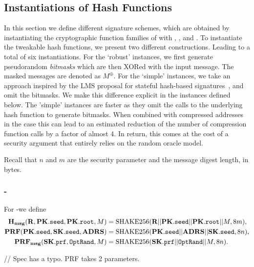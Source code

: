 

\subsection{Instantiations of Hash Functions}
\label{subsec:instanthash}
In this section we define different signature schemes, which are obtained 
by instantiating the cryptographic function families of \spx with \shatwo, 
\shathree, and \haraka. To instantiate the tweakable hash functions,
we present two different constructions. Leading to a total of six instantiations.
For the `robust' instances,
we first generate pseudorandom \emph{bitmasks}
which are then XORed with the input message. The masked messages are denoted
as $M^{\oplus}$.
For the `simple' instances, we take an approach inspired by the LMS proposal for stateful hash-based signatures~\cite{LMSdraft}, and omit the bitmasks.
We make this difference explicit in the instances defined below. The 'simple' instances 
are faster as they omit the calls to the underlying hash function to generate bitmasks. When combined with compressed addresses in the \shatwo case this can lead to an estimated reduction of the number of 
compression function calls by a factor of almost 4. In return, this comes at the cost of a 
security argument that entirely relies on the random oracle model. 

Recall that $n$ and $m$ are the security parameter and the message digest length, in bytes.

\subsubsection{\spx-\shathree}
   For \spx-\shathree we define
   \begin{equation}
      \begin{aligned}
         \mathbf{H_{msg}}(\mathbf{R},\mathbf{PK}.\texttt{seed}, \mathbf{PK}.\texttt{root}, M) &= \text{SHAKE256}(\mathbf{R} || \mathbf{PK}.\texttt{seed} || \mathbf{PK}.\texttt{root} || M, 8m),\\
         \mathbf{PRF}(\mathbf{PK}.\texttt{seed}, \mathbf{SK}.\texttt{seed}, \textbf{ADRS}) &= \text{SHAKE256}(\mathbf{PK}.\texttt{seed} || \textbf{ADRS} || \mathbf{SK}.\texttt{seed}, 8n),\\
         \mathbf{PRF_{msg}}(\mathbf{SK}.\texttt{prf}, \texttt{OptRand}, M) &= \text{SHAKE256}(\mathbf{SK}.\texttt{prf} || \texttt{OptRand} || M, 8n).\\
      \end{aligned}
    \end{equation}

\begin{code}
  // Spec has a typo. PRF takes 2 parameters.
\end{code}

